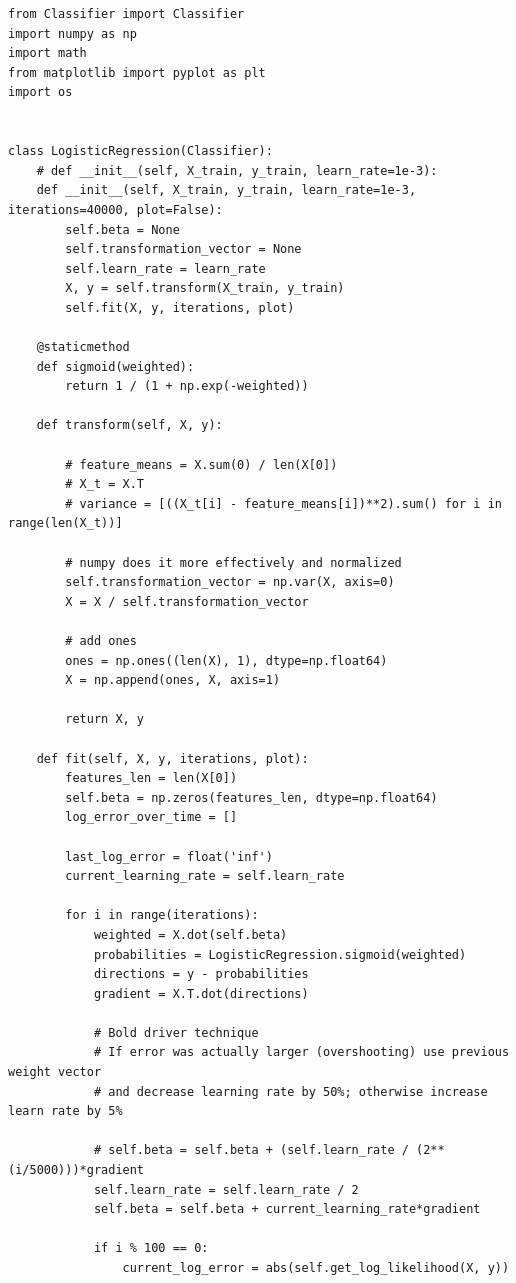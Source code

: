 \begin{lstlisting}[style=py]
from Classifier import Classifier
import numpy as np
import math
from matplotlib import pyplot as plt
import os


class LogisticRegression(Classifier):
    # def __init__(self, X_train, y_train, learn_rate=1e-3):
    def __init__(self, X_train, y_train, learn_rate=1e-3, iterations=40000, plot=False):
        self.beta = None
        self.transformation_vector = None
        self.learn_rate = learn_rate
        X, y = self.transform(X_train, y_train)
        self.fit(X, y, iterations, plot)

    @staticmethod
    def sigmoid(weighted):
        return 1 / (1 + np.exp(-weighted))

    def transform(self, X, y):

        # feature_means = X.sum(0) / len(X[0])
        # X_t = X.T
        # variance = [((X_t[i] - feature_means[i])**2).sum() for i in range(len(X_t))]

        # numpy does it more effectively and normalized
        self.transformation_vector = np.var(X, axis=0)
        X = X / self.transformation_vector

        # add ones
        ones = np.ones((len(X), 1), dtype=np.float64)
        X = np.append(ones, X, axis=1)

        return X, y

    def fit(self, X, y, iterations, plot):
        features_len = len(X[0])
        self.beta = np.zeros(features_len, dtype=np.float64)
        log_error_over_time = []

        last_log_error = float('inf')
        current_learning_rate = self.learn_rate

        for i in range(iterations):
            weighted = X.dot(self.beta)
            probabilities = LogisticRegression.sigmoid(weighted)
            directions = y - probabilities
            gradient = X.T.dot(directions)

            # Bold driver technique
            # If error was actually larger (overshooting) use previous weight vector
            # and decrease learning rate by 50%; otherwise increase learn rate by 5%

            # self.beta = self.beta + (self.learn_rate / (2**(i/5000)))*gradient
            self.learn_rate = self.learn_rate / 2
            self.beta = self.beta + current_learning_rate*gradient

            if i % 100 == 0:
                current_log_error = abs(self.get_log_likelihood(X, y))


\end{lstlisting}
